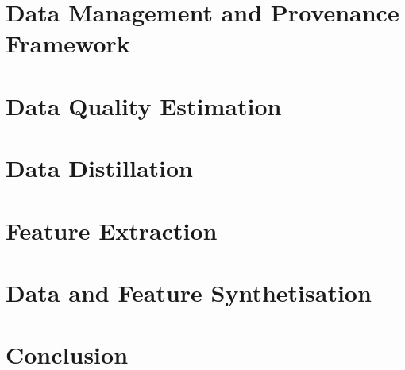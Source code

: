 \documentclass{manolo}
\begin{document}
\clearpage
\section{Data Management and Provenance Framework}
\label{sec:datmgmt}


\clearpage
\section{Data Quality Estimation}
\label{sec:datqual}


\clearpage
\section{Data Distillation}
\label{sec:datdist}


\clearpage
\section{Feature Extraction}
\label{sec:featextr}


\clearpage
\section{Data and Feature Synthetisation}
\label{sec:datsynth}



\clearpage
\section{Conclusion}

\clearpage



\end{document}
